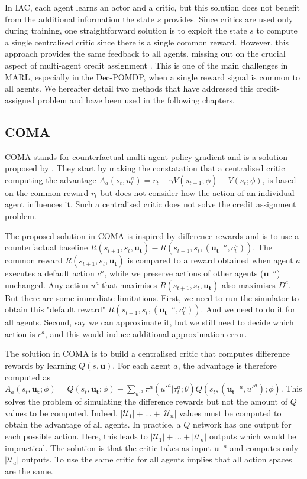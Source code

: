 In IAC, each agent learns an actor and a critic, but this solution does not benefit from the additional information the state $s$ provides.
Since critics are used only during training, one straightforward solution is to exploit the state $s$ to compute a single centralised critic since there is a single common reward.
However, this approach provides the same feedback to all agents, missing out on the crucial aspect of multi-agent credit assignment \citep{chang2003all}.
This is one of the main challenges in MARL, especially in the Dec-POMDP, when a single reward signal is common to all agents.
We hereafter detail two methods that have addressed this credit-assigned problem and have been used in the following chapters.

\subsection{COMA}
COMA stands for counterfactual multi-agent policy gradient and is a solution proposed by \cite{foerster2017coma}.
They start by making the constatation that a centralised critic computing the advantage $A_a(s_t, u^a_t) = r_t + \gamma V(s_{t+1}; \phi) - V(s_t; \phi)$, is based on the common reward $r_t$ but does not consider how the action of an individual agent influences it.
Such a centralised critic does not solve the credit assignment problem.

The proposed solution in COMA is inspired by difference rewards \citep{wolpert2001optimal} and is to use a counterfactual baseline $R(s_{t+1}, s_t, \boldsymbol {u_t}) - R(s_{t+1}, s_t, (\boldsymbol{u_t}^{-a}, c_t^a))$.
The common reward $R(s_{t+1}, s_t, \boldsymbol {u_t})$ is compared to a reward obtained when agent $a$ executes a default action $c^a$, while we preserve actions of other agents ($\mathbf{u}^{-a}$) unchanged.
Any action $u^a$ that maximises $R(s_{t+1}, s_t, \boldsymbol {u_t})$ also maximises $D^a$.
But there are some immediate limitations.
First, we need to run the simulator to obtain this "default reward" $R(s_{t+1}, s_t, (\boldsymbol{u_t}^{-a}, c_t^a))$.
And we need to do it for all agents.
Second, say we can approximate it, but we still need to decide which action is $c^a$, and this would induce additional approximation error.

The solution in COMA is to build a centralised critic that computes difference rewards by learning $Q(s, \mathbf{u})$.
For each agent $a$, the advantage is therefore computed as $A_a(s_t,\boldsymbol{u_t}; \phi)=Q(s_t, \boldsymbol{u_t};\phi) - \sum_{u'^{a}} \pi^a({u'^{a}} |\tau_t^a;\theta) Q(s_t, (\boldsymbol{u_t}^{-a}, u'^{a}); \phi)$.
This solves the problem of simulating the difference rewards but not the amount of $Q$ values to be computed.
Indeed, $|\mathcal{U}_1|+...+|\mathcal{U}_n|$ values must be computed to obtain the advantage of all agents.
In practice, a $Q$ network has one output for each possible action.
Here, this leads to $|\mathcal{U}_1|+...+|\mathcal{U}_n|$ outputs which would be impractical.
The solution is that the critic takes as input $\boldsymbol{u}^{-a}$ and computes only $|\mathcal{U}_a|$ outputs.
To use the same critic for all agents implies that all action spaces are the same.

